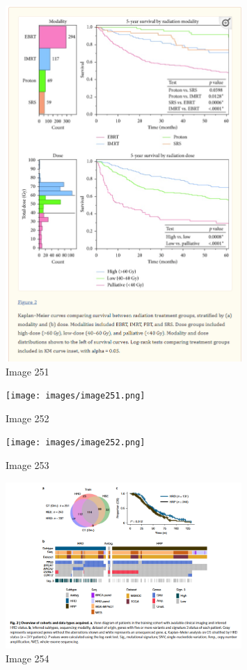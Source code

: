 \documentclass{article}%
\begin{document}
%


\begin{figure}[h!]%
\centering%
\includegraphics[width=0.8\textwidth]{images/image250.png}%
\caption{Image 251}%
\end{figure}

%


\begin{figure}[h!]%
\centering%
\texttt{[image: images/image251.png]}%
\caption{Image 252}%
\end{figure}

%


\begin{figure}[h!]%
\centering%
\texttt{[image: images/image252.png]}%
\caption{Image 253}%
\end{figure}

%


\begin{figure}[h!]%
\centering%
\includegraphics[width=0.8\textwidth]{images/image253.png}%
\caption{Image 254}%
\end{figure}
\end{document}
